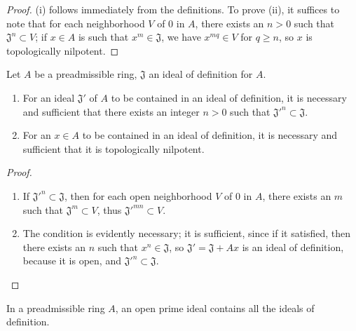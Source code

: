 \begin{proof}
\label{proof-0.7.1.3}
(i) follows immediately from the definitions. To prove (ii), it suffices to note that for
each neighborhood $V$ of $0$ in $A$, there exists an $n>0$ such that
$\mathfrak{J}^n\subset V$; if $x\in A$ is such that $x^m\in\mathfrak{J}$, we have
$x^{mq}\in V$ for $q\geq n$, so $x$ is topologically nilpotent.
\end{proof}

\begin{proposition}[7.1.4]
\label{0.7.1.4}
Let $A$ be a preadmissible ring, $\mathfrak{J}$ an ideal of definition for $A$.
\begin{enumerate}
  \item[{\rm(i)}] For an ideal $\mathfrak{J}'$ of $A$ to be contained in an ideal of
    definition, it is necessary and sufficient that there exists an integer
    $n>0$ such that ${\mathfrak{J}'}^n\subset\mathfrak{J}$.
  \item[{\rm(ii)}] For an $x\in A$ to be contained in an ideal of definition, it is
    necessary and sufficient that it is topologically nilpotent.
\end{enumerate}
\end{proposition}

\begin{proof}
\label{proof-0.7.1.4}
\medskip\noindent
\begin{enumerate}
  \item[(i)] If ${\mathfrak{J}'}^n\subset\mathfrak{J}$, then for each open neighborhood
    $V$ of $0$ in $A$, there exists an $m$ such that $\mathfrak{J}^m\subset V$, thus
    ${\mathfrak{J}'}^{mn}\subset V$.
  \item[(ii)] The condition is evidently necessary; it is sufficient, since if it
    satisfied, then there exists an $n$ such that $x^n\in\mathfrak{J}$, so
    $\mathfrak{J}'=\mathfrak{J}+Ax$ is an ideal of definition, because it is
    open, and ${\mathfrak{J}'}^n\subset\mathfrak{J}$.
\end{enumerate}
\end{proof}

\begin{corollary}[7.1.5]
\label{0.7.1.5}
In a preadmissible ring $A$, an open prime ideal contains all the ideals of definition.
\end{corollary}

